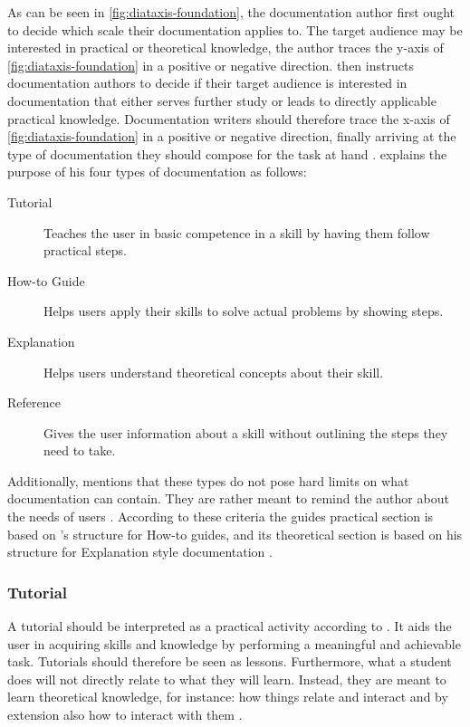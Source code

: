 \noindent
As can be seen in \cref{fig:diataxis-foundation}, the documentation author first ought to decide which scale their documentation applies to.
The target audience may be interested in practical or theoretical knowledge, the author traces the y-axis of \cref{fig:diataxis-foundation} in a positive or negative direction.
\citeauthor{procidaDiataxisDocumentationFramework2023} then instructs documentation authors to decide if their target audience is interested in documentation that either serves further study or leads to directly applicable practical knowledge.
Documentation writers should therefore trace the x-axis of \cref{fig:diataxis-foundation} in a positive or negative direction, finally arriving at the type of documentation they should compose for the task at hand \cite{procidaPythonDocsCommunity2022}.
\citeauthor{procidaDiataxisDocumentationFramework2023} explains the purpose of his four types of documentation as follows:
\begin{description}
	\item[Tutorial] Teaches the user in basic competence in a skill by having them follow practical steps.
	\item[How-to Guide] Helps users apply their skills to solve actual problems by showing steps.
	\item[Explanation] Helps users understand theoretical concepts about their skill.
	\item[Reference] Gives the user information about a skill without outlining the steps they need to take.
\end{description}
\noindent
Additionally, \citeauthor{procidaDiataxisDocumentationFramework2023} mentions that these types do not pose hard limits on what documentation can contain. They are rather meant to remind the author about the needs of users \cite{procidaDiataxisDocumentationFramework2023}.
According to these criteria the guides practical section is based on \citeauthor{procidaDiataxisDocumentationFramework2023}'s structure for How-to guides, and its theoretical section is based on his structure for Explanation style documentation \cite{procidaDiataxisDocumentationFramework2023}.

\subsubsection*{Tutorial}
A tutorial should be interpreted as a practical activity according to \citeauthor{procidaDiataxisDocumentationFramework2023} \cite{procidaDiataxisDocumentationFramework2023}.
It aids the user in acquiring skills and knowledge by performing a meaningful and achievable task.
Tutorials should therefore be seen as lessons.
Furthermore, what a student does will not directly relate to what they will learn.
Instead, they are meant to learn theoretical knowledge, for instance: how things relate and interact and by extension also how to interact with them \cite{procidaPythonDocsCommunity2022,procidaDiataxisDocumentationFramework2023}.

